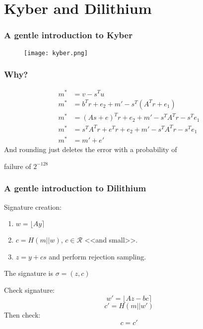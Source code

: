 \documentclass[presentation]{beamer}
\begin{document}
\section{Kyber and Dilithium}
\begin{frame}[label=a-gentle-introduction-to-kyber]
  \frametitle{A gentle introduction to Kyber}
  \begin{figure}
    \centering
    \texttt{[image: kyber.png]}
  \end{figure}
\end{frame}
\begin{frame}
  \frametitle{Why?}
  \begin{equation}
    \begin{array}{rl}
      m^* &= v - s^T u \\
      m^* &= b^T r + e_2 + m' - s^T(A^T r + e_1) \\
      m^* &= (As+e)^Tr + e_2 + m' - s^TA^Tr - s^Te_1 \\
      m^* &= s^TA^Tr + e^Tr + e_2 + m'  - s^TA^Tr - s^Te_1 \\
      m^* &= m' + e'
    \end{array}
  \end{equation}
  And rounding just deletes the error with a probability of

  failure of $2^{-128}$
\end{frame}
\begin{frame}[label=a-gentle-introduction-to-dilithium]
  \frametitle{A gentle introduction to Dilithium}
  Signature creation:
  \begin{enumerate} 
    \item $w = \lfloor Ay \rceil$
    \item $c = H(m || w)$, $c \in \mathcal R$ <<and small>>.
    \item $z = y + cs$ and perform rejection sampling.
  \end{enumerate}
  The signature is $\sigma = (z, c)$
  \pause

  Check signature:
  \[w' = \lfloor Az - bc \rceil \]
  \[c' = H(m || w') \]
  Then check:
  \[c = c'\]
\end{frame}
\end{document}
